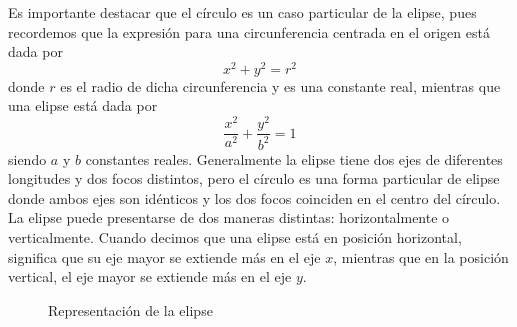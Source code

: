 \begin{reminder}
    Es importante destacar que el círculo es un caso particular de la elipse, pues recordemos que la expresión para una circunferencia centrada en el origen está dada por
    $$x^2 + y^2 = r^2$$
    donde $r$ es el radio de dicha circunferencia y es una constante real, mientras que una elipse está dada por
    $$\frac{x^2}{a^2} + \frac{y^2}{b^2} = 1$$
    siendo $a$ y $b$ constantes reales. Generalmente la elipse tiene dos ejes de diferentes longitudes y dos focos distintos, pero el círculo es una forma particular de elipse donde ambos ejes son idénticos y los dos focos coinciden en el centro del círculo. La elipse puede presentarse de dos maneras distintas: horizontalmente o verticalmente. Cuando decimos que una elipse está en posición horizontal, significa que su eje mayor se extiende más en el eje $x$, mientras que en la posición vertical, el eje mayor se extiende más en el eje $y$.
    \begin{figure}[h!]
        \centering
         \hfill
        \caption{Representación de la elipse}
    \end{figure}
    

\end{reminder}
